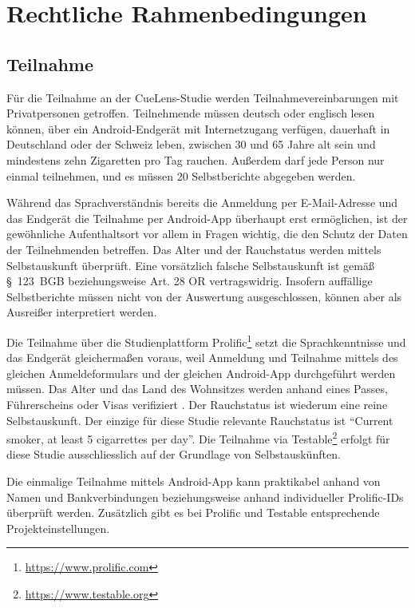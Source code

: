 

\chapter{Rechtliche Rahmenbedingungen}
\section{Teilnahme}
Für die Teilnahme an der CueLens-Studie werden Teilnahmevereinbarungen mit Privatpersonen getroffen. Teilnehmende müssen deutsch oder englisch lesen können, über ein Android-Endgerät mit Internetzugang verfügen, dauerhaft in Deutschland oder der Schweiz leben, zwischen 30 und 65 Jahre alt sein und mindestens zehn Zigaretten pro Tag rauchen. Außerdem darf jede Person nur einmal teilnehmen, und es müssen 20 Selbstberichte abgegeben werden. 

Während das Sprachverständnis bereits die Anmeldung per E-Mail-Adresse und das Endgerät die Teilnahme per Android-App überhaupt erst ermöglichen, ist der gewöhnliche Aufenthaltsort vor allem in Fragen wichtig, die den Schutz der Daten der Teilnehmenden betreffen. Das Alter und der Rauchstatus werden mittels Selbstauskunft überprüft. Eine vorsätzlich falsche Selbstauskunft ist gemäß §~123~BGB beziehungsweise Art. 28 OR vertragswidrig. Insofern auffällige Selbstberichte müssen nicht von der Auswertung ausgeschlossen, können aber als Ausreißer interpretiert werden. 

Die Teilnahme über die Studienplattform Prolific\footnote{\url{https://www.prolific.com}} setzt die Sprachkenntnisse und das Endgerät gleichermaßen voraus, weil Anmeldung und Teilnahme mittels des gleichen Anmeldeformulars und der gleichen Android-App durchgeführt werden müssen. Das Alter und das Land des Wohnsitzes werden anhand eines Passes, Führerscheins oder Visas verifiziert \cite{prolificVerificationOnboardingGuide2026}. Der Rauchstatus ist wiederum eine reine Selbstauskunft. Der einzige für diese Studie relevante Rauchstatus ist \enquote{Current smoker, at least 5 cigarrettes per day}. Die Teilnahme via Testable\footnote{\url{https://www.testable.org}} erfolgt für diese Studie ausschliesslich auf der Grundlage von Selbstauskünften.

Die einmalige Teilnahme mittels Android-App kann praktikabel anhand von Namen und Bankverbindungen beziehungsweise anhand individueller Prolific-IDs überprüft werden. Zusätzlich gibt es bei Prolific und Testable entsprechende Projekteinstellungen.

